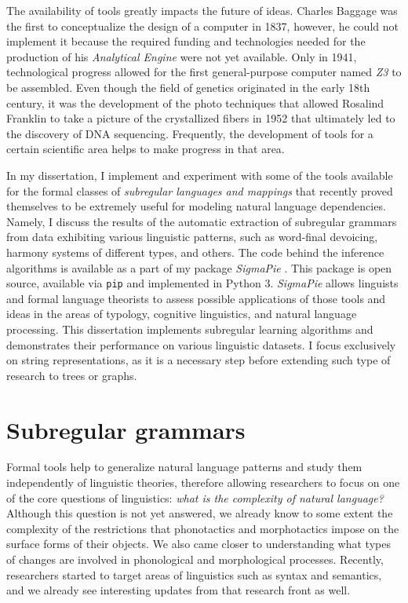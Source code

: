 The availability of tools greatly impacts the future of ideas.
Charles Baggage was the first to conceptualize the design of a computer in 1837, however, he could not implement it because the required funding and technologies needed for the production of his \emph{Analytical Engine} were not yet available.
Only in 1941, technological progress allowed for the first general-purpose computer named \emph{Z3} to be assembled.
Even though the field of genetics originated in the early 18th century, it was the development of the photo techniques that allowed Rosalind Franklin to take a picture of the crystallized fibers in 1952 that ultimately led to the discovery of DNA sequencing.
Frequently, the development of tools for a certain scientific area helps to make progress in that area.


In my dissertation, I implement and experiment with some of the tools available for the formal classes of \emph{subregular languages and mappings} that recently proved themselves to be extremely useful for modeling natural language dependencies.
Namely, I discuss the results of the automatic extraction of subregular grammars from data exhibiting various linguistic patterns, such as word-final devoicing, harmony systems of different types, and others.
The code behind the inference algorithms is available as a part of my package \emph{SigmaPie} \href{https://pypi.org/project/SigmaPie/}{\faCube} \citep{sigmapie}.
This package is open source, available via \texttt{pip} and implemented in Python 3.
\emph{SigmaPie} allows linguists and formal language theorists to assess possible applications of those tools and ideas in the areas of typology, cognitive linguistics, and natural language processing.
This dissertation implements subregular learning algorithms and demonstrates their performance on various linguistic datasets.
I focus exclusively on string representations, as it is a necessary step before extending such type of research to trees or graphs.


\section{Subregular grammars}


Formal tools help to generalize natural language patterns and study them independently of linguistic theories, therefore allowing researchers to focus on one of the core questions of linguistics: \emph{what is the complexity of natural language?}
Although this question is not yet answered, we already know to some extent the complexity of the restrictions that phonotactics and morphotactics impose on the surface forms of their objects.
We also came closer to understanding what types of changes are involved in phonological and morphological processes.
Recently, researchers started to target areas of linguistics such as syntax and semantics, and we already see interesting updates from that research front as well.



